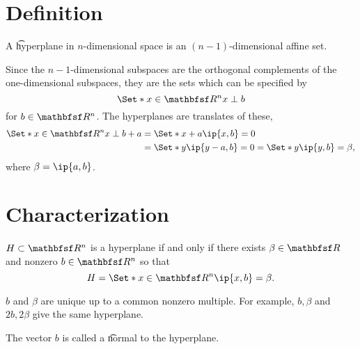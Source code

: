 
\section*{Definition}

A \t{hyperplane} in $n$-dimensional space is an $(n-1)$-dimensional affine set.

Since the $n-1$-dimensional subspaces are the orthogonal complements of the one-dimensional subspaces, they are the sets which can be specified by
  \[
\Set*{x \in \R ^n}{x \perp b}
  \]
for $b \in \R ^n$.
The hyperplanes are translates of these,
  \[
\begin{aligned}
\Set*{x \in \R ^n}{x \perp b} + a &= \Set*{x + a}{\ip{x,b} = 0} \\
&= \Set*{y}{\ip{y - a,b} = 0} = \Set*{y}{\ip{y,b} = \beta }, \\
\end{aligned}
  \]
where $\beta  = \ip{a,b}$.

\section*{Characterization}

\begin{prop}
$H \subset \R ^n$ is a hyperplane if and only if there exists $\beta  \in \R $ and nonzero $b \in \R ^n$ so that
$$
H = \Set*{x \in \R ^n}{\ip{x,b} = \beta }.
$$
\end{prop}
\begin{remark}
$b$ and $\beta $ are unique up to a common nonzero multiple.
For example, $b, \beta $ and $2b, 2\beta $ give the same hyperplane.
\end{remark}
\begin{remark}
The vector $b$ is called a \t{normal} to the hyperplane.
\end{remark}

\blankpage